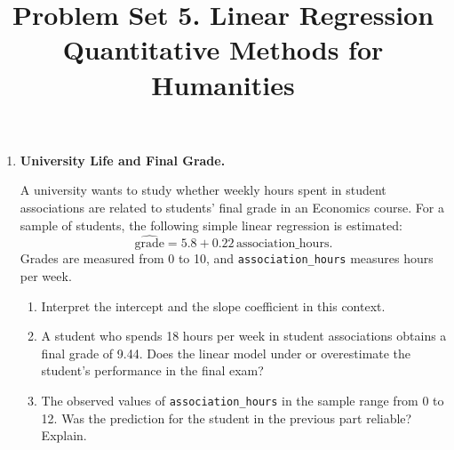 \documentclass[12pt]{article}
\author{\empty}
\title{Problem Set 5. Linear Regression \\ Quantitative Methods for Humanities}
\date{\empty}
\newif\ifsolutions
\begin{document}
\maketitle

\bigskip

\begin{enumerate}
    \item \textbf{University Life and Final Grade.}

    A university wants to study whether weekly hours spent in student associations are related to students' final grade in an Economics course. For a sample of students, the following simple linear regression is estimated:
    \[
        \widehat{\text{grade}} = 5.8 + 0.22\,\text{association\_hours}.
    \]
    Grades are measured from 0 to 10, and \texttt{association\_hours} measures hours per week.

    \begin{enumerate}[label=(\alph*)]
        \item Interpret the intercept and the slope coefficient in this context.
        \item A student who spends 18 hours per week in student associations obtains a final grade of 9.44. Does the linear model under or overestimate the student's performance in the final exam?
        \item The observed values of \texttt{association\_hours} in the sample range from 0 to 12. Was the prediction for the student in the previous part reliable? Explain.
    \end{enumerate}

    \ifsolutions \color{blue} \textbf{Solution:} \\
    \begin{enumerate}[label=(\alph*)]
        \item The intercept, 5.8, is the predicted grade for a student who spends 0 hours per week in student associations. The slope, 0.22, means that increasing association participation by one hour per week is associated with an increase of 0.22 points in the predicted grade, on average.
        \item For 6 hours:
        \[
            \widehat{\text{grade}} = 5.8 + 0.22 \times 6 = 5.8 + 1.32 = 7.12.
        \]
        \item Using \(\widehat u = \widehat Y - Y\),
        \[
            \widehat u = 7.12 - 6.7 = 0.42.
        \]
        The residual is positive because the model overpredicts this student's grade by 0.42 points.
        \item This would be an extrapolation, because 18 hours is outside the observed range of the predictor in the sample. The prediction is therefore less reliable than a prediction made within the range 0 to 12.
    \end{enumerate}
    \fi \color{black}


\end{enumerate}
\end{document}

